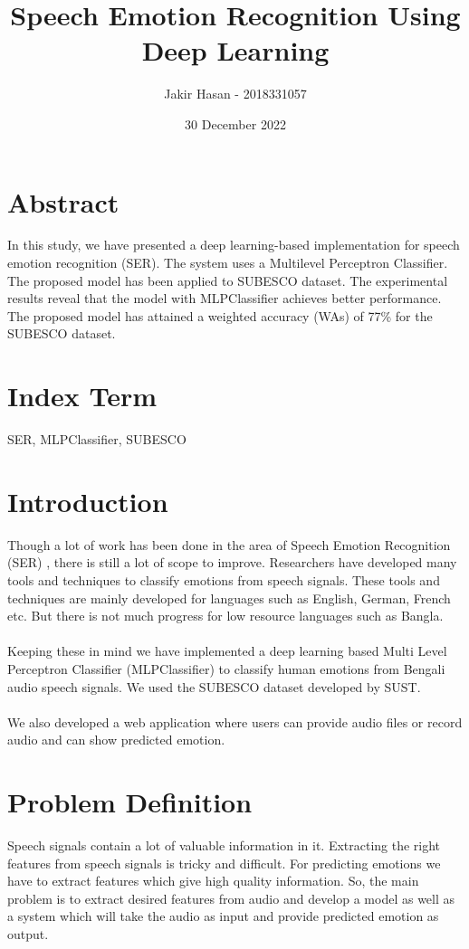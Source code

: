 \documentclass[a4paper, 12pt]{report}
\begin{document}
\title{Speech Emotion Recognition Using Deep Learning}
\author{Jakir Hasan - 2018331057}
\date{30 December 2022}
\maketitle
{}
\newpage
{}
\setcounter{chapter}{1}

\section{Abstract}
In this study, we have presented a deep learning-based implementation for speech emotion recognition (SER). The system uses a Multilevel Perceptron Classifier. The proposed model has been applied to SUBESCO dataset. The experimental results reveal that the model with MLPClassifier achieves better performance. The proposed model has attained a weighted accuracy (WAs) of 77\% for the SUBESCO dataset.

\section{Index Term}
SER, MLPClassifier, SUBESCO

\section{Introduction}
Though a lot of work has been done in the area of Speech Emotion Recognition (SER) , there is still a lot of scope to improve. Researchers have developed many tools and techniques to classify emotions from speech signals. These tools and techniques are mainly developed for languages such as English, German, French etc. But there is not much progress for low resource languages such as Bangla.\\\\
Keeping these in mind we have implemented a deep learning based Multi Level Perceptron Classifier (MLPClassifier) to classify human emotions from Bengali audio speech signals. We used the SUBESCO dataset developed by SUST. \\\\
We also developed a web application where users can provide audio files or record audio and can show predicted emotion.\\


\section{Problem Definition}
Speech signals contain a lot of valuable information in it. Extracting the right features from speech signals is tricky and difficult. For predicting emotions we have to extract features which give high quality information. So, the main problem is to extract desired features from audio and develop a model as well as a system which will take the audio as input and provide predicted emotion as output.
\end{document}
